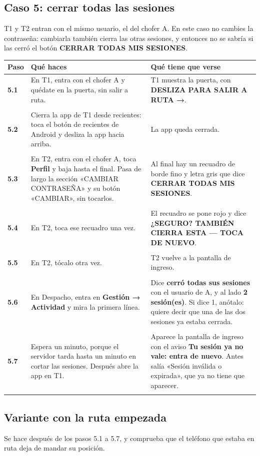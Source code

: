 \documentclass[10pt,a4paper]{article}
\makeatletter
\newcommand{\toca}[1]{\textcolor{azul}{\textbf{#1}}}
\newcommand{\pantalla}[1]{\textcolor{marron}{\textbf{#1}}}
\newcommand{\caja}[2]{\hbox{\vrule height #1 depth 0pt width 0pt #2}}
\newcommand{\campo}[3]{%
  \raisebox{-0.35\height}{\caja{#3}{\TextField[name=#1, width=#2, height=#3, charsize=8pt, bordercolor={0.55 0.6 0.68},
    backgroundcolor={0.965 0.976 0.992}, multiline=true]{}}}}
\newcommand{\resultado}[1]{%
  \caja{9pt}{\ChoiceMenu[radio, name=resultado-#1, width=9pt, height=9pt, radiosymbol=l,
    bordercolor={0.35 0.38 0.45}, default=]{}{OK=ok,FALLA=falla,NO SE PUDO=nopudo}}}
\newcommand{\paso}[4]{%
  \textbf{#1} & #3 & #4 \\*
  \multicolumn{3}{@{\hspace{6pt}}l@{}}{\rule{0pt}{15pt}\small
    \resultado{#2}\hspace{0.4em}Hora:~\campo{hora-#2}{1.7cm}{13pt}\hspace{1.2em}Nota:~\campo{nota-#2}{8.3cm}{22pt}}\\[3pt]
  \hline
}
\newenvironment{pasos}{%
  \begin{longtable}{@{\hspace{6pt}}>{\raggedright\arraybackslash}p{0.9cm}>{\raggedright\arraybackslash}p{7.9cm}>{\raggedright\arraybackslash}p{7.3cm}@{}}
  \rowcolor{cabecera}\textbf{Paso} & \textbf{Qué haces} & \textbf{Qué tiene que verse} \\ \hline
  \endhead
}{\end{longtable}\vspace{-0.6em}}
\makeatother
\begin{document}
\begin{Form}
\section{Caso 5: cerrar todas las sesiones}

T1 y T2 entran con el mismo usuario, el del chofer A. En este caso no cambies la contraseña: cambiarla también cierra las otras sesiones, y entonces no se sabría si las cerró el botón \toca{CERRAR TODAS MIS SESIONES}.

\begin{pasos}
\paso{5.1}{5-1}{En T1, entra con el chofer A y quédate en la puerta, sin salir a ruta.}{T1 muestra la puerta, con \pantalla{DESLIZA PARA SALIR A RUTA →}.}
\paso{5.2}{5-2}{Cierra la app de T1 desde recientes: toca el botón de recientes de Android y desliza la app hacia arriba.}{La app queda cerrada.}
\paso{5.3}{5-3}{En T2, entra con el chofer A, toca \toca{Perfil} y baja hasta el final. Pasa de largo la sección «CAMBIAR CONTRASEÑA» y su botón «CAMBIAR», sin tocarlos.}{Al final hay un recuadro de borde fino y letra gris que dice \pantalla{CERRAR TODAS MIS SESIONES}.}
\paso{5.4}{5-4}{En T2, toca ese recuadro una vez.}{El recuadro se pone rojo y dice \pantalla{¿SEGURO? TAMBIÉN CIERRA ESTA — TOCA DE NUEVO}.}
\paso{5.5}{5-5}{En T2, tócalo otra vez.}{T2 vuelve a la pantalla de ingreso.}
\paso{5.6}{5-6}{En Despacho, entra en \toca{Gestión → Actividad} y mira la primera línea.}{Dice \pantalla{cerró todas sus sesiones} con el usuario de A, y al lado \pantalla{2 sesión(es)}. Si dice 1, anótalo: quiere decir que una de las dos sesiones ya estaba cerrada.}
\paso{5.7}{5-7}{Espera un minuto, porque el servidor tarda hasta un minuto en cortar las sesiones. Después abre la app en T1.}{Aparece la pantalla de ingreso con el aviso \pantalla{Tu sesión ya no vale: entra de nuevo}. Antes salía «Sesión inválida o expirada», que ya no tiene que aparecer.}
\end{pasos}

\subsection{Variante con la ruta empezada}

Se hace después de los pasos 5.1 a 5.7, y comprueba que el teléfono que estaba en ruta deja de mandar su posición.


\end{Form}
\end{document}
